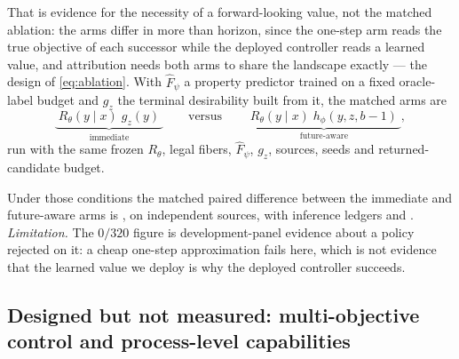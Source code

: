 That is evidence for the necessity of a forward-looking value, not the matched ablation: the arms differ in more than horizon, since the one-step arm reads the true objective of each successor while the deployed controller reads a learned value, and attribution needs both arms to share the landscape exactly --- the design of \eqref{eq:ablation}.
With $\widehat F_\psi$ a property predictor trained on a fixed oracle-label budget and $g_z$ the terminal desirability built from it, the matched arms are
\begin{equation}
\underbrace{\;R_\theta(y\mid x)\;g_z(y)\;}_{\text{immediate}}
\qquad\text{versus}\qquad
\underbrace{\;R_\theta(y\mid x)\;h_\phi(y,z,b-1)\;}_{\text{future-aware}},
\label{eq:ablation}
\end{equation}
run with the same frozen $R_\theta$, legal fibers, $\widehat F_\psi$, $g_z$, sources, seeds and returned-candidate budget.

Under those conditions the matched paired difference between the immediate and future-aware arms is \XXX{}, on \XXX{} independent sources, with inference ledgers \XXX{} and \XXX{}.
\emph{Limitation.} The $0/320$ figure is development-panel evidence about a policy rejected on it: a cheap one-step approximation fails here, which is not evidence that the learned value we deploy is why the deployed controller succeeds.

\subsection{Designed but not measured: multi-objective control and process-level capabilities}
\label{sec:exp-multiobj}
\label{sec:exp-capabilities}

